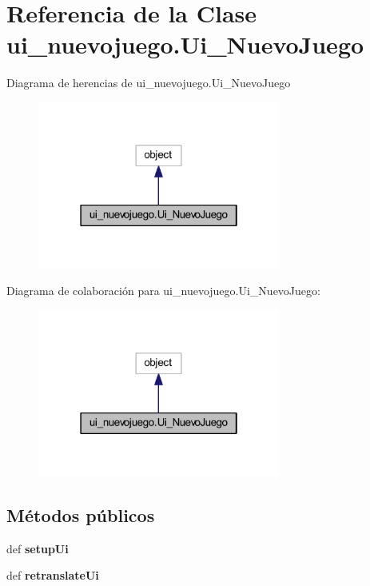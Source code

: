 \section{Referencia de la Clase ui\-\_\-nuevojuego.\-Ui\-\_\-\-Nuevo\-Juego}
\label{classui__nuevojuego_1_1_ui___nuevo_juego}


Diagrama de herencias de ui\-\_\-nuevojuego.\-Ui\-\_\-\-Nuevo\-Juego\nopagebreak
\begin{figure}[H]
\begin{center}
\leavevmode
\includegraphics[width=226pt]{classui__nuevojuego_1_1_ui___nuevo_juego__inherit__graph}
\end{center}
\end{figure}


Diagrama de colaboración para ui\-\_\-nuevojuego.\-Ui\-\_\-\-Nuevo\-Juego\-:\nopagebreak
\begin{figure}[H]
\begin{center}
\leavevmode
\includegraphics[width=226pt]{classui__nuevojuego_1_1_ui___nuevo_juego__coll__graph}
\end{center}
\end{figure}
\subsection*{Métodos públicos}
\begin{DoxyCompactItemize}
\item 
def {\bfseries setup\-Ui}\label{classui__nuevojuego_1_1_ui___nuevo_juego_ac7a796d972cef2bdb1a9ebeec292d877}

\item 
def {\bfseries retranslate\-Ui}\label{classui__nuevojuego_1_1_ui___nuevo_juego_ad2b5d240f563508e306a321214eb48c0}

\end{DoxyCompactItemize}
